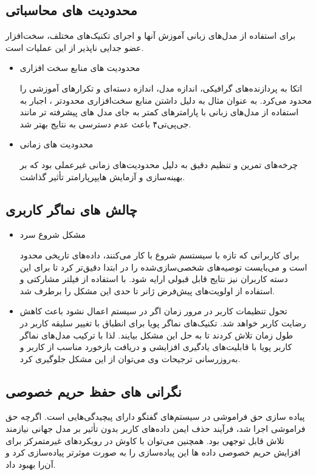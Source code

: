 \subsection{محدودیت های محاسباتی}
برای استفاده از مدل‌های زبانی آموزش آنها و اجرای تکنیک‌های مختلف، سخت‌افزار عضو جدایی ناپذیر از این عملیات است. 

\begin{itemize}
\item
محدودیت های منابع سخت افزاری

 اتکا به پردازنده‌های گرافیکی، اندازه مدل، اندازه دسته‌ای و تکرارهای آموزشی را محدود می‌کرد. به عنوان مثال به دلیل داشتن منابع سخت‌افزاری محدودتر ، اجبار به استفاده از مدل‌های زبانی با پارامترهای کمتر به جای مدل های پیشرفته تر مانند جی‌پی‌تی۴ باعث عدم دسترسی به نتایج بهتر شد.

\item
 محدودیت های زمانی

 چرخه‌های تمرین و تنظیم دقیق به دلیل محدودیت‌های زمانی غیرعملی بود که بر بهینه‌سازی و آزمایش هایپرپارامتر تأثیر گذاشت.
\end{itemize}


\subsection{چالش های نماگر کاربری}
\begin{itemize}
\item
مشکل شروع سرد

برای کاربرانی که تازه با سیستسم شروع با کار می‌کنند، داده‌های تاریخی محدود است و می‌بایست توصیه‌های شخصی‌سازی‌شده را در ابتدا دقیق‌تر کرد تا برای این دسته کاربران نیز نتایج قابل قبولی ارایه شود. با استفاده از فیلتر مشارکتی و استفاده از اولویت‌های پیش‌فرض ژانر تا حدی این مشکل را برطرف شد.

\item
تحول تنظیمات کاربر در مرور زمان اگر در سیستم اعمال نشود باعث کاهش رضایت کاربر خواهد شد. تکنیک‌های نماگر پویا برای انطباق با تغییر سلیقه کاربر در طول زمان تلاش کردند تا به حل این مشکل بیایند. لذا با ترکیب مدل‌های نماگر کاربر پویا با قابلیت‌های یادگیری افزایشی و دریافت بازخورد مناسب از کاربر و به‌روزرسانی ترجیحات وی می‌توان از این مشکل جلوگیری کرد.
\end{itemize}

\subsection{نگرانی های حفظ حریم خصوصی}
پیاده سازی حق فراموشی در سیستم‌‌های گفتگو دارای پیچیدگی‌هایی است. اگرچه حق فراموشی اجرا شد، فرآیند حذف ایمن داده‌های کاربر بدون تأثیر بر مدل جهانی نیازمند تلاش قابل توجهی بود. همچنین می‌توان با کاوش در رویکردهای غیرمتمرکز برای افزایش حریم خصوصی داده ها این پیاده‌سازی را به صورت موثرتر پیاده‌سازی کرد و آن‌را بهبود داد.


